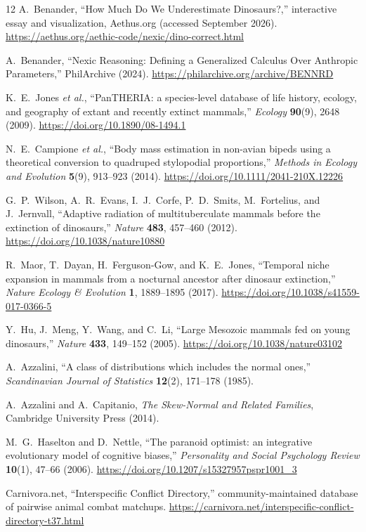 \documentclass[11pt]{article}
\begin{document}
\begin{thebibliography}{12}
A.~Benander,
``How Much Do We Underestimate Dinosaurs?,'' interactive essay and visualization, Aethus.org (accessed September 2026).
\url{https://aethus.org/aethic-code/nexic/dino-correct.html}

A.~Benander,
``Nexic Reasoning: Defining a Generalized Calculus Over Anthropic Parameters,'' PhilArchive (2024).
\url{https://philarchive.org/archive/BENNRD}

K.~E.~Jones \textit{et al.},
``PanTHERIA: a species-level database of life history, ecology, and geography of extant and recently extinct mammals,''
\textit{Ecology} \textbf{90}(9), 2648 (2009).
\url{https://doi.org/10.1890/08-1494.1}

N.~E.~Campione \textit{et al.},
``Body mass estimation in non-avian bipeds using a theoretical conversion to quadruped stylopodial proportions,''
\textit{Methods in Ecology and Evolution} \textbf{5}(9), 913--923 (2014).
\url{https://doi.org/10.1111/2041-210X.12226}

G.~P.~Wilson, A.~R.~Evans, I.~J.~Corfe, P.~D.~Smits, M.~Fortelius, and J.~Jernvall,
``Adaptive radiation of multituberculate mammals before the extinction of dinosaurs,''
\textit{Nature} \textbf{483}, 457--460 (2012).
\url{https://doi.org/10.1038/nature10880}

R.~Maor, T.~Dayan, H.~Ferguson-Gow, and K.~E.~Jones,
``Temporal niche expansion in mammals from a nocturnal ancestor after dinosaur extinction,''
\textit{Nature Ecology \& Evolution} \textbf{1}, 1889--1895 (2017).
\url{https://doi.org/10.1038/s41559-017-0366-5}

Y.~Hu, J.~Meng, Y.~Wang, and C.~Li,
``Large Mesozoic mammals fed on young dinosaurs,''
\textit{Nature} \textbf{433}, 149--152 (2005).
\url{https://doi.org/10.1038/nature03102}

A.~Azzalini,
``A class of distributions which includes the normal ones,''
\textit{Scandinavian Journal of Statistics} \textbf{12}(2), 171--178 (1985).

A.~Azzalini and A.~Capitanio,
\textit{The Skew-Normal and Related Families},
Cambridge University Press (2014).

M.~G.~Haselton and D.~Nettle,
``The paranoid optimist: an integrative evolutionary model of cognitive biases,''
\textit{Personality and Social Psychology Review} \textbf{10}(1), 47--66 (2006).
\url{https://doi.org/10.1207/s15327957pspr1001_3}

Carnivora.net,
``Interspecific Conflict Directory,'' community-maintained database of pairwise animal combat matchups.
\url{https://carnivora.net/interspecific-conflict-directory-t37.html}
\end{thebibliography}
\end{document}
